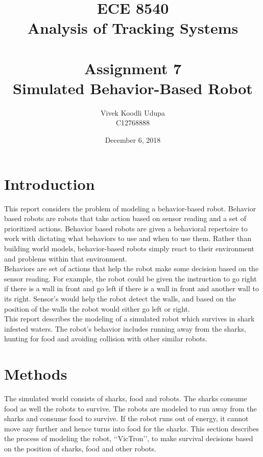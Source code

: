\documentclass[12pt]{article}
\title{ECE 8540 \\ Analysis of Tracking Systems \\ \quad \\
	Assignment 7 \\ Simulated Behavior-Based Robot}
\author{Vivek Koodli Udupa \\ C12768888}
\date{December 6, 2018 }
\begin{document}
\begin{mdframed}
\maketitle
\end{mdframed}


\section{Introduction}
This report considers the problem of modeling a behavior-based robot. Behavior based robots are robots that take action based on sensor reading and a set of prioritized actions. Behavior based robots are given a behavioral repertoire to work with dictating what behaviors to use and when to use them. Rather than building world models, behavior-based robots simply react to their environment and problems within that environment. \\

Behaviors are set of actions that help the robot make some decision based on the sensor reading. For example, the robot could be given the instruction to go right if there is a wall in front and go left if there is a wall in front and another wall to its right. Sensor's would help the robot detect the walls, and based on the position of the walls the robot would either go left or right. \\

This report describes the modeling of a simulated robot which survives in shark infested waters. The robot's behavior includes running away from the sharks, hunting for food and avoiding collision with other similar robots. 

\section{Methods}
The simulated world consists of sharks, food and robots. The sharks consume food as well the robots to survive. The robots are modeled to run away from the sharks and consume food to survive. If the robot runs out of energy, it cannot move any further and hence turns into food for the sharks. This section describes the process of modeling the robot, \lq\lq{VicTron}\rq\rq{}, to make survival decisions based on the position of sharks, food and other robots. \\
\end{document}
